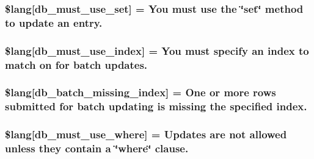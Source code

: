 \subsubsection[{\$lang}]{\setlength{\rightskip}{0pt plus 5cm}\$lang\mbox{[}\textquotesingle{}db\+\_\+must\+\_\+use\+\_\+set\textquotesingle{}\mbox{]} = \textquotesingle{}You must use the \char`\"{}set\char`\"{} method to update an entry.\textquotesingle{}}\label{system_2language_2english_2db__lang_8php_a55e22fb14cedc8ee7f70980bf7f37308}
\hypertarget{system_2language_2english_2db__lang_8php_a708419b6b94728c30474ee5fdde3b99b}{}
\subsubsection[{\$lang}]{\setlength{\rightskip}{0pt plus 5cm}\$lang\mbox{[}\textquotesingle{}db\+\_\+must\+\_\+use\+\_\+index\textquotesingle{}\mbox{]} = \textquotesingle{}You must specify an index to match {\bf on} {\bf for} batch updates.\textquotesingle{}}\label{system_2language_2english_2db__lang_8php_a708419b6b94728c30474ee5fdde3b99b}
\hypertarget{system_2language_2english_2db__lang_8php_af946769a3dd5679c60e6f2ef5f7a5aa1}{}
\subsubsection[{\$lang}]{\setlength{\rightskip}{0pt plus 5cm}\$lang\mbox{[}\textquotesingle{}db\+\_\+batch\+\_\+missing\+\_\+index\textquotesingle{}\mbox{]} = \textquotesingle{}One or more rows submitted {\bf for} batch updating is missing the specified index.\textquotesingle{}}\label{system_2language_2english_2db__lang_8php_af946769a3dd5679c60e6f2ef5f7a5aa1}
\hypertarget{system_2language_2english_2db__lang_8php_add4bfc65af76fda2c48fa6a2e8d2e506}{}
\subsubsection[{\$lang}]{\setlength{\rightskip}{0pt plus 5cm}\$lang\mbox{[}\textquotesingle{}db\+\_\+must\+\_\+use\+\_\+where\textquotesingle{}\mbox{]} = \textquotesingle{}Updates are not allowed unless they contain {\bf a} \char`\"{}where\char`\"{} clause.\textquotesingle{}}\label{system_2language_2english_2db__lang_8php_add4bfc65af76fda2c48fa6a2e8d2e506}
\hypertarget{system_2language_2english_2db__lang_8php_a256ae2de791e589ddc23012f74f390ea}{}
